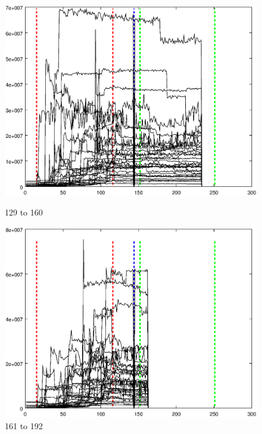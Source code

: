 \documentclass{article}
\begin{document}
\begin{figure}[h]
\centering
\begin{minipage}{.49\textwidth}
	\centering
	\includegraphics[width=0.79\linewidth]{measurement/spad_129-160}
	\caption{129 to 160}
	\label{fig:spad_129-160}
\end{minipage}
\begin{minipage}{.49\textwidth}
	\centering
	\includegraphics[width=0.79\linewidth]{measurement/spad_161-192}
	\caption{161 to 192}
	\label{fig:spad_161-192}
\end{minipage}
\end{figure}
\end{document}
